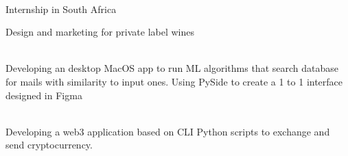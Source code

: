\documentclass[a4paper]{MagicalCV}
\begin{document}
\begin{minipage}[t]{0.49\textwidth}
 \\
\vspace{\topsep} %
\begin{tightemize}
 \item Internship in South Africa
\item Design and marketing for private label wines
\end{tightemize}
\sectionsep
%
%


 \\
Developing an desktop MacOS app to run ML algorithms that search database for mails with similarity to input ones. Using
PySide to create a 1 to 1 interface designed in Figma
\sectionsep

 \\
Developing a web3 application based on CLI Python scripts to exchange and send cryptocurrency.

\end{minipage}
\end{document}
